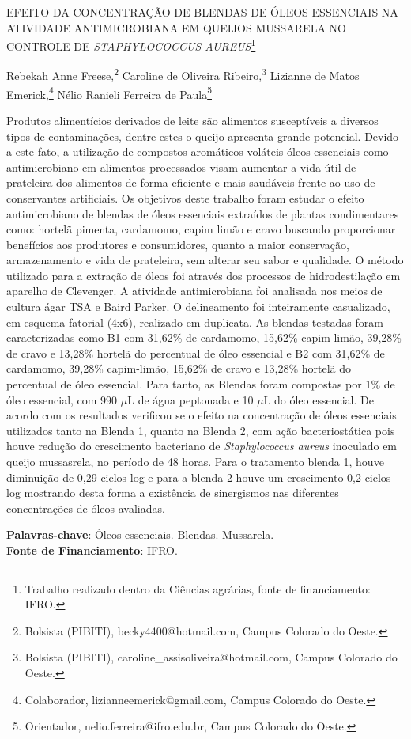 \documentclass[article,12pt,onesidea,4paper,english,brazil]{abntex2}
\begin{document}
	
	
	\frenchspacing 
	
	\begin{center}
		\LARGE EFEITO DA CONCENTRAÇÃO DE BLENDAS DE ÓLEOS ESSENCIAIS NA ATIVIDADE ANTIMICROBIANA EM QUEIJOS MUSSARELA NO CONTROLE DE \textit{STAPHYLOCOCCUS AUREUS}\footnote{Trabalho realizado dentro da Ciências agrárias, fonte de financiamento: IFRO.}
		
		\normalsize
	Rebekah Anne Freese,\footnote{Bolsista (PIBITI), becky4400@hotmail.com, Campus Colorado do Oeste.} 
		Caroline de Oliveira Ribeiro,\footnote{Bolsista (PIBITI), caroline\_assisoliveira@hotmail.com, Campus Colorado do Oeste.} 
	Lizianne de Matos Emerick,\footnote{Colaborador, lizianneemerick@gmail.com, Campus Colorado do Oeste.} 
		Nélio Ranieli Ferreira de Paula\footnote{Orientador, nelio.ferreira@ifro.edu.br, Campus Colorado do Oeste.} 
	\end{center}
	
	\noindent Produtos alimentícios derivados de leite são alimentos susceptíveis a diversos tipos de contaminações, dentre estes o queijo apresenta grande potencial. Devido a este fato, a utilização de compostos aromáticos voláteis óleos essenciais como antimicrobiano em alimentos processados visam aumentar a vida útil de prateleira dos alimentos de forma eficiente e mais saudáveis frente ao uso de conservantes artificiais. Os objetivos deste trabalho foram estudar o efeito antimicrobiano de blendas de óleos essenciais extraídos de plantas condimentares como: hortelã pimenta, cardamomo, capim limão e cravo buscando proporcionar benefícios aos produtores e consumidores, quanto a maior conservação, armazenamento e vida de prateleira, sem alterar seu sabor e qualidade. O método utilizado para a extração de óleos foi através dos processos de hidrodestilação em aparelho de Clevenger. A atividade antimicrobiana foi analisada nos meios de cultura ágar TSA e Baird Parker. O delineamento foi inteiramente casualizado, em esquema fatorial (4x6), realizado em duplicata. As blendas testadas foram caracterizadas como B1 com 31,62\% de cardamomo, 15,62\% capim-limão, 39,28\% de cravo e 13,28\% hortelã do percentual de óleo essencial e B2 com 31,62\% de cardamomo, 39,28\% capim-limão, 15,62\% de cravo e 13,28\% hortelã do percentual de óleo essencial. Para tanto, as Blendas foram compostas por 1\% de óleo essencial, com 990 $\mu$L de água peptonada e 10 $\mu$L do óleo essencial. De acordo com os resultados verificou se o efeito na concentração de óleos essenciais utilizados tanto na Blenda 1, quanto na Blenda 2, com ação bacteriostática pois houve redução do crescimento bacteriano de \textit{Staphylococcus aureus} inoculado em queijo mussasrela, no período de 48 horas. Para o tratamento blenda 1, houve diminuição de 0,29 ciclos log e para a blenda 2 houve um crescimento 0,2 ciclos log mostrando desta forma a existência de sinergismos nas diferentes concentrações de óleos avaliadas.
	
	\vspace{\onelineskip}
	
	\noindent
	\textbf{Palavras-chave}: Óleos essenciais. Blendas. Mussarela.\\
	\textbf{Fonte de Financiamento}: IFRO.
	
\end{document}
